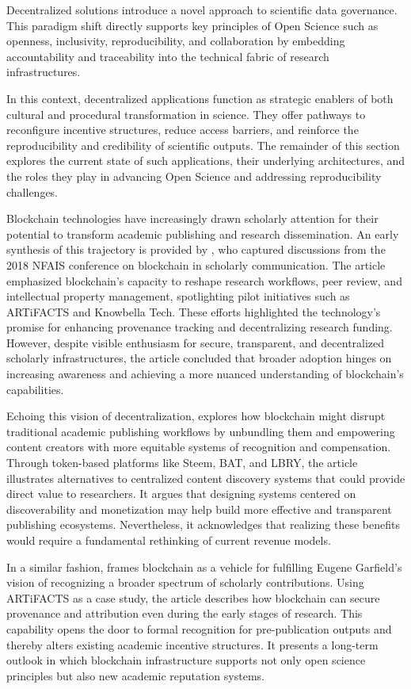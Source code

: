 \documentclass{article}
\begin{document}
Decentralized solutions introduce a novel approach to scientific data governance. This paradigm shift directly supports key principles of Open Science such as openness, inclusivity, reproducibility, and collaboration by embedding accountability and traceability into the technical fabric of research infrastructures.

In this context, decentralized applications function as strategic enablers of both cultural and procedural transformation in science. They offer pathways to reconfigure incentive structures, reduce access barriers, and reinforce the reproducibility and credibility of scientific outputs. The remainder of this section explores the current state of such applications, their underlying architectures, and the roles they play in advancing Open Science and addressing reproducibility challenges.

Blockchain technologies have increasingly drawn scholarly attention for their potential to transform academic publishing and research dissemination. An early synthesis of this trajectory is provided by \cite{lawlor_overview_2018}, who captured discussions from the 2018 NFAIS conference on blockchain in scholarly communication. The article emphasized blockchain’s capacity to reshape research workflows, peer review, and intellectual property management, spotlighting pilot initiatives such as ARTiFACTS and Knowbella Tech. These efforts highlighted the technology’s promise for enhancing provenance tracking and decentralizing research funding. However, despite visible enthusiasm for secure, transparent, and decentralized scholarly infrastructures, the article concluded that broader adoption hinges on increasing awareness and achieving a more nuanced understanding of blockchain’s capabilities.

Echoing this vision of decentralization, \cite{holmen_blockchain_2018} explores how blockchain might disrupt traditional academic publishing workflows by unbundling them and empowering content creators with more equitable systems of recognition and compensation. Through token-based platforms like Steem, BAT, and LBRY, the article illustrates alternatives to centralized content discovery systems that could provide direct value to researchers. It argues that designing systems centered on discoverability and monetization may help build more effective and transparent publishing ecosystems. Nevertheless, it acknowledges that realizing these benefits would require a fundamental rethinking of current revenue models.

In a similar fashion, \cite{kochalko_making_2019} frames blockchain as a vehicle for fulfilling Eugene Garfield’s vision of recognizing a broader spectrum of scholarly contributions. Using ARTiFACTS as a case study, the article describes how blockchain can secure provenance and attribution even during the early stages of research. This capability opens the door to formal recognition for pre-publication outputs and thereby alters existing academic incentive structures. It presents a long-term outlook in which blockchain infrastructure supports not only open science principles but also new academic reputation systems.
\end{document}
